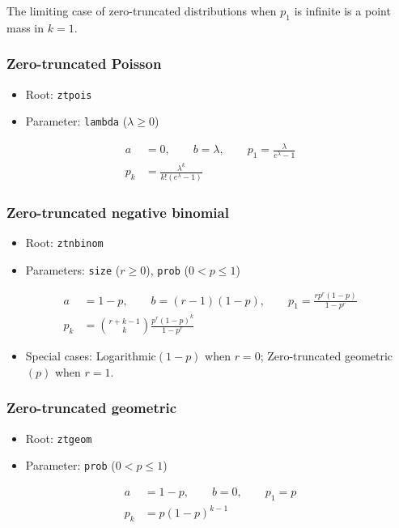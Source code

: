 \documentclass[x11names]{article}
\newcommand{\code}[1]{\texttt{#1}}
\begin{document}
The limiting case of zero-truncated distributions when $p_1$ is
infinite is a point mass in $k = 1$.

\subsubsection{Zero-truncated Poisson}

\begin{itemize}
\item Root: \code{ztpois}
\item Parameter: \code{lambda} ($\lambda \geq 0$)
\end{itemize}
\begin{align*}
  a &= 0, \qquad b = \lambda, \qquad
      p_1 = \frac{\lambda}{e^\lambda - 1} \\
  p_k &= \frac{\lambda^k}{k! (e^\lambda - 1)}
\end{align*}

\subsubsection{Zero-truncated negative binomial}

\begin{itemize}
\item Root: \code{ztnbinom}
\item Parameters: \code{size} ($r \geq 0$),
  \code{prob} ($0 < p \leq 1$)
\end{itemize}
\begin{align*}
  a &= 1 - p, \qquad b = (r - 1)(1 - p), \qquad
      p_1 = \frac{r p^r (1 - p)}{1 - p^r} \\
  p_k &= \binom{r+k-1}{k} \frac{p^r (1 - p)^k}{1 - p^r}
\end{align*}

\begin{itemize}
\item Special cases:  Logarithmic$(1 - p)$ when $r = 0$;
  Zero-truncated geometric$(p)$ when $r = 1$.
\end{itemize}

\subsubsection{Zero-truncated geometric}

\begin{itemize}
\item Root: \code{ztgeom}
\item Parameter: \code{prob} ($0 < p \leq 1$)
\end{itemize}
\begin{align*}
  a &= 1 - p, \qquad b = 0, \qquad p_1 = p \\
  p_k &= p (1 - p)^{k - 1}
\end{align*}
\end{document}
